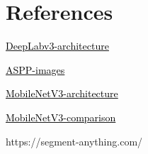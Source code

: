 \section{References}

\begin{thebibliography}{00}

 \href{https://www.researchgate.net/profile/Mma-Hashem/publication/352562164/figure/fig2/AS:1037138292396032@1624284446240/DeepLabv3-architecture.png}{\textcolor{black}{DeepLabv3-architecture}}

 \href{https://www.researchgate.net/publication/352562164/figure/fig1/AS:1037138292396032@1624284446239Illustrations-of-a-convolution-and-b-atrous-convolution.png}{\textcolor{black}{ASPP-images}}

 \href{https://d3i71xaburhd42.cloudfront.net/7e0884e27643c212f32e9ab5dacfb552922eda07/2-Figure1-1.png}{\textcolor{black}{MobileNetV3-architecture}}

 \href{https://d3i71xaburhd42.cloudfront.net/915f986f1edce79cdde3c6ab7d335a7f14db4d2c/2-Figure1-1.png}{\textcolor{black}{MobileNetV3-comparison}}

 https://segment-anything.com/

\end{thebibliography}
